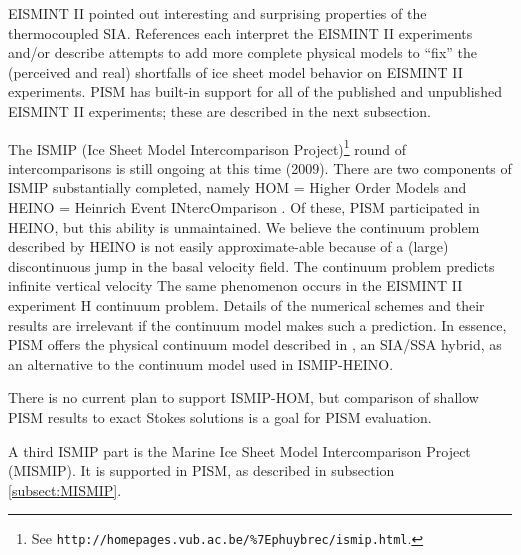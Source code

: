 \documentclass[11pt,final]{amsart}
\begin{document}
EISMINT II \cite{EISMINT00} pointed out interesting and surprising properties of the thermocoupled SIA.  References \cite{BBL,Hindmarsh04,Hindmarsh06,PayneBaldwin,SaitoEISMINT} each interpret the EISMINT II experiments and/or describe attempts to add more complete physical models to ``fix'' the (perceived and real) shortfalls of ice sheet model behavior on EISMINT II experiments.  PISM has built-in support for all of the published and unpublished EISMINT II experiments; these are described in the next subsection.

The ISMIP (Ice Sheet Model Intercomparison Project)\footnote{See \texttt{http://homepages.vub.ac.be/\%7Ephuybrec/ismip.html}.} round of intercomparisons is still ongoing at this time (2009).  There are two components of ISMIP substantially completed, namely HOM = Higher Order Models \cite{HOMtcd,HOMelmer} and HEINO = Heinrich Event INtercOmparison \cite{GreveTakahamaCalov}.  Of these, PISM participated in HEINO, but this ability is unmaintained.   We believe the continuum problem described by HEINO is not easily approximate-able because of a (large) discontinuous jump in the basal velocity field.  The continuum problem predicts infinite vertical velocity \cite[Appendix B]{BBssasliding}  The same phenomenon occurs in the EISMINT II experiment H continuum problem.  Details of the numerical schemes and their results are irrelevant if the continuum model makes such a prediction.  In essence, PISM offers the physical continuum model described in \cite{BBssasliding}, an SIA/SSA hybrid, as an alternative to the continuum model used in ISMIP-HEINO.

There is no current plan to support ISMIP-HOM, but comparison of shallow PISM results to exact Stokes solutions is a goal for PISM evaluation.

A third ISMIP part is the Marine Ice Sheet Model Intercomparison Project (MISMIP).  It is supported in PISM, as described in subsection \ref{subsect:MISMIP}.
\end{document}
